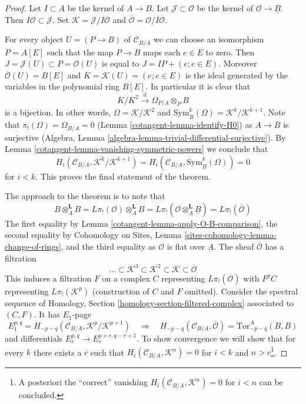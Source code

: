 \begin{proof}

Let $I \subset A$ be the kernel of $A \to B$. Let
$\mathcal{J} \subset \mathcal{O}$
be the kernel of $\mathcal{O} \to \underline{B}$. Then
$I\mathcal{O} \subset \mathcal{J}$. Set
$\mathcal{K} = \mathcal{J}/I\mathcal{O}$ and
$\overline{\mathcal{O}} = \mathcal{O}/I\mathcal{O}$.

\medskip\noindent
For every object $U = (P \to B)$ of $\mathcal{C}_{B/A}$
we can choose an isomorphism $P = A[E]$ such that the map
$P \to B$ maps each $e \in E$ to zero. Then
$J = \mathcal{J}(U) \subset P = \mathcal{O}(U)$
is equal to $J = IP + (e; e \in E)$. Moreover
$\overline{\mathcal{O}}(U) = B[E]$ and $K = \mathcal{K}(U) = (e; e \in E)$
is the ideal generated by the variables in the polynomial ring $B[E]$.
In particular it is clear that
$$
K/K^2 \xrightarrow{\text{d}} \Omega_{P/A} \otimes_P B
$$
is a bijection. In other words, $\Omega = \mathcal{K}/\mathcal{K}^2$
and $\text{Sym}_B^k(\Omega) = \mathcal{K}^k/\mathcal{K}^{k + 1}$.
Note that $\pi_!(\Omega) = \Omega_{B/A} = 0$ (Lemma \ref{cotangent-lemma-identify-H0})
as $A \to B$ is surjective
(Algebra, Lemma \ref{algebra-lemma-trivial-differential-surjective}).
By Lemma \ref{cotangent-lemma-vanishing-symmetric-powers} we conclude that
$$
H_i(\mathcal{C}_{B/A}, \mathcal{K}^k/\mathcal{K}^{k + 1}) =
H_i(\mathcal{C}_{B/A}, \text{Sym}^k_{\underline{B}}(\Omega)) = 0
$$
for $i < k$. This proves the final statement of the theorem.

\medskip\noindent
The approach to the theorem is to note that
$$
B \otimes_A^\mathbf{L} B = L\pi_!(\mathcal{O}) \otimes_A^\mathbf{L} B =
L\pi_!(\mathcal{O} \otimes_{\underline{A}}^\mathbf{L} \underline{B}) =
L\pi_!(\overline{\mathcal{O}})
$$
The first equality by Lemma \ref{cotangent-lemma-apply-O-B-comparison},
the second equality by
Cohomology on Sites, Lemma \ref{sites-cohomology-lemma-change-of-rings}, and
the third equality as $\mathcal{O}$ is flat over $\underline{A}$.
The sheaf $\overline{\mathcal{O}}$ has a filtration
$$
\ldots \subset
\mathcal{K}^3 \subset
\mathcal{K}^2 \subset
\mathcal{K} \subset
\overline{\mathcal{O}}
$$
This induces a filtration $F$ on a complex $C$ representing
$L\pi_!(\overline{\mathcal{O}})$ with $F^pC$ representing
$L\pi_!(\mathcal{K}^p)$ (construction of $C$ and $F$ omitted).
Consider the spectral sequence of
Homology, Section \ref{homology-section-filtered-complex}
associated to $(C, F)$. It has $E_1$-page
$$
E_1^{p, q} = H_{- p - q}(\mathcal{C}_{B/A}, \mathcal{K}^p/\mathcal{K}^{p + 1})
\quad\Rightarrow\quad
H_{- p - q}(\mathcal{C}_{B/A}, \overline{\mathcal{O}}) =
\text{Tor}_{- p - q}^A(B, B)
$$
and differentials $E_r^{p, q} \to E_r^{p + r, q - r + 1}$. To show convergence
we will show that for every $k$ there exists a $c$ such that
$H_i(\mathcal{C}_{B/A}, \mathcal{K}^n) = 0$
for $i < k$ and $n > c$\footnote{A posteriori
the ``correct'' vanishing $H_i(\mathcal{C}_{B/A}, \mathcal{K}^n) = 0$ for
$i < n$ can be concluded.}.


\end{proof}
